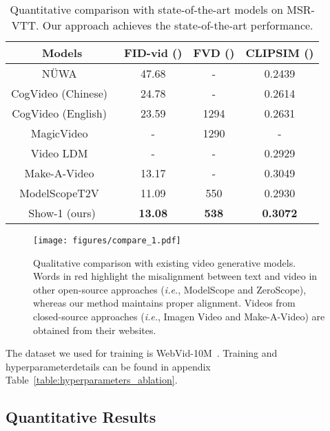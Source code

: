 \documentclass{article} \usepackage{iclr2024_conference,times}
\newcommand{\ie}{\textit{i.e.}}
\begin{document}
 \begin{table}[t]
\centering


\caption{
Quantitative comparison with state-of-the-art models on MSR-VTT. Our approach achieves the state-of-the-art performance.}
\begin{tabular}{c|ccc}
\hline
\textbf{Models}              & FID-vid ()   &  FVD () & CLIPSIM () \\ \hline
N\"UWA~\citep{wu2022nuwa}       & 47.68   & -  & 0.2439        \\
CogVideo (Chinese)~\citep{hong2022cogvideo}   & 24.78 & - & 0.2614      \\
CogVideo (English)~\citep{hong2022cogvideo}   & 23.59  & 1294 & 0.2631  \\
MagicVideo~\citep{zhou2022magicvideo}          & -    & 1290 & -        \\
Video LDM~\citep{blattmann2023align}      & -   &  - & 0.2929 \\ 
Make-A-Video~\citep{singer2022make}        & 13.17 &  -& 0.3049     \\ 
ModelScopeT2V~\citep{wang2023modelscope}  &   11.09 & 550 & 0.2930    \\ 
\hline

Show-1 (ours) &  \textbf{13.08} & \textbf{538} & \textbf{0.3072}   \\ \hline
\end{tabular}



\label{mrtt}
\end{table} 

\begin{figure}[t!]
    \centering
    \texttt{[image: figures/compare\_1.pdf]}
    \caption{Qualitative comparison with existing video generative models. Words in red highlight the misalignment between text and video in other open-source approaches (\ie, ModelScope and ZeroScope), whereas our method maintains proper alignment. Videos from closed-source approaches (\ie, Imagen Video and Make-A-Video) are obtained from their websites.}
    \label{fig:compare_1}
\end{figure}

The dataset we used for training is WebVid-10M~\citep{bain2021frozen}. 
Training and hyperparameterdetails can be found in appendix Table~\ref{table:hyperparameters_ablation}.




\subsection{Quantitative Results}
\end{document}
